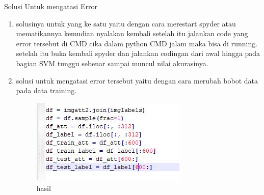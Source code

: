 Solusi Untuk mengatasi Error
\begin{enumerate}
\item solusinya untuk yang ke satu yaitu dengan cara merestart spyder atau mematikannya kemudian nyalakan kembali setelah itu jalankan code yang error tersebut di CMD cika dalam python CMD jalam maka bisa di running. setelah itu buka kembali spyder dan jalankan codingan dari awal hingga pada bagian SVM tunggu sebenar sampai muncul nilai akurasinya.
\item solusi untuk mengatasi error tersebut yaitu dengan cara merubah bobot data pada data training.
\begin{figure}[ht]
\centering
\includegraphics[scale=0.5]{figures/1174042/chapter3/3,2.JPG}
\caption{hasil}
\label{contoh}
\end{figure}
\end{enumerate}

